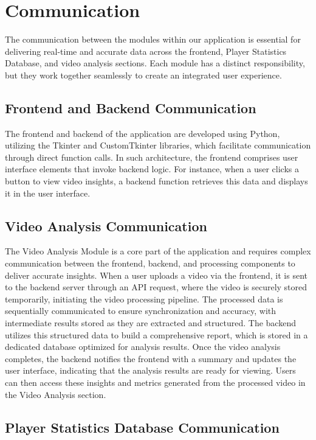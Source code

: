 \documentclass{article}
\begin{document}
\section{Communication}
The communication between the modules within our application is essential for delivering real-time and accurate data across the frontend, Player Statistics Database, and video analysis sections. Each module has a distinct responsibility, but they work together seamlessly to create an integrated user experience.

\subsection{Frontend and Backend Communication}
The frontend and backend of the application are developed using Python, utilizing the Tkinter \cite{Tkinter} and CustomTkinter \cite{CustomTkinter} libraries, which facilitate communication through direct function calls. In such architecture, the frontend comprises user interface elements that invoke backend logic. For instance, when a user clicks a button to view video insights, a backend function retrieves this data and displays it in the user interface.
\subsection{Video Analysis Communication}

The Video Analysis Module is a core part of the application and requires complex communication between the frontend, backend, and processing components to deliver accurate insights. When a user uploads a video via the frontend, it is sent to the backend server through an API request, where the video is securely stored temporarily, initiating the video processing pipeline. The processed data is sequentially communicated to ensure synchronization and accuracy, with intermediate results stored as they are extracted and structured. The backend utilizes this structured data to build a comprehensive report, which is stored in a dedicated database optimized for analysis results. Once the video analysis completes, the backend notifies the frontend with a summary and updates the user interface, indicating that the analysis results are ready for viewing. Users can then access these insights and metrics generated from the processed video in the Video Analysis section.


\subsection{Player Statistics Database Communication}
\end{document}
